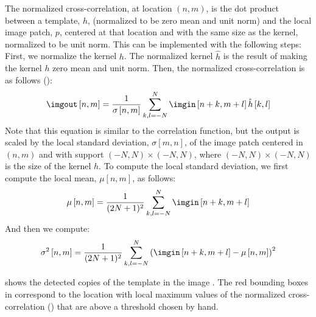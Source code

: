 The normalized cross-correlation, at location $(n,m)$, is the dot product between a template, $h$, (normalized to be zero mean and unit norm) and the local image patch, $p$, centered at that location and with the same size as the kernel, normalized to be unit norm. This can be implemented with the following steps: First, we normalize the kernel $h$. The normalized kernel $\hat h$ is the result of making the kernel $h$ zero mean and unit norm. Then, the normalized cross-correlation is as follows ():
\begin{equation}
\imgout \left[n,m\right] 
                = 
                \frac{1}{\sigma \left[n,m \right]}
                \sum_{k,l=-N}^N
                \imgin \left[n+k,m+l \right]
                \hat{h} \left[k,l \right]
\end{equation}
Note that this equation is similar to the correlation function, but the output is scaled by the local standard deviation, $\sigma \left[m,n \right]$, of the image patch centered in $(n,m)$ and with support $(-N,N)\times(-N,N)$, where $(-N,N)\times(-N,N)$ is the size of the kernel $h$. To compute the local standard deviation, we first compute the local mean, $\mu \left[n,m \right]$, as follows:
\begin{equation}
\mu \left[n,m \right] = \frac{1}{(2N+1)^2} \sum_{k,l=-N}^N \imgin \left[n+k,m+l \right]
\end{equation}
And then we compute:
\begin{equation}
\sigma^2 \left[n,m \right] = \frac{1}{(2N+1)^2} \sum_{k,l=-N}^N \left( \imgin \left[n+k,m+l \right] - \mu \left[n,m \right] \right) ^2
\end{equation}

 shows the detected copies of the template  in the image . The red bounding boxes in  correspond to the location with local maximum values of the normalized cross-correlation () that are above a threshold chosen by hand.   

